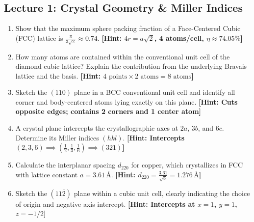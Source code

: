\documentclass[11pt,a4paper]{article}
\begin{document}
\subsection*{Lecture 1: Crystal Geometry \& Miller Indices}
\begin{enumerate}[leftmargin=1.8em, label=\textbf{1.\arabic*}]
    \item Show that the maximum sphere packing fraction of a Face-Centered Cubic (FCC) lattice is $\frac{\pi}{3\sqrt{2}} \approx 0.74$. \hfill \textbf{[Hint: $4r = a\sqrt{2}$, 4 atoms/cell, $\eta \approx 74.05\%$]}
    \item How many atoms are contained within the conventional unit cell of the diamond cubic lattice? Explain the contribution from the underlying Bravais lattice and the basis. \hfill \textbf{[Hint: $4 \text{ points} \times 2 \text{ atoms} = 8\text{ atoms}$]}
    \item Sketch the $(110)$ plane in a BCC conventional unit cell and identify all corner and body-centered atoms lying exactly on this plane. \hfill \textbf{[Hint: Cuts opposite edges; contains 2 corners and 1 center atom]}
    \item A crystal plane intercepts the crystallographic axes at $2a$, $3b$, and $6c$. Determine its Miller indices $(hkl)$. \hfill \textbf{[Hint: Intercepts $(2,3,6) \implies (\frac{1}{2}, \frac{1}{3}, \frac{1}{6}) \implies (321)$]}
    \item Calculate the interplanar spacing $d_{220}$ for copper, which crystallizes in FCC with lattice constant $a = 3.61\,\text{\AA}$. \hfill \textbf{[Hint: $d_{220} = \frac{3.61}{\sqrt{8}} = 1.276\,\text{\AA}$]}
    \item Sketch the $(11\bar{2})$ plane within a cubic unit cell, clearly indicating the choice of origin and negative axis intercept. \hfill \textbf{[Hint: Intercepts at $x=1$, $y=1$, $z=-1/2$]}
\end{enumerate}
\end{document}
